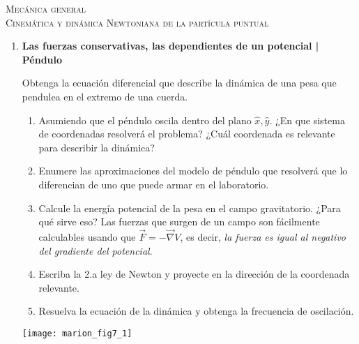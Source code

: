 \documentclass[11pt,spanish,a4paper]{article}
\begin{document}
\begin{center}
  \textsc{\large Mecánica general}\\
  \textsc{\large Cinemática y dinámica Newtoniana de la partícula puntual}
\end{center}

\begin{enumerate}


\subsection*{Ecuaciones de la dinámica - 2"a ley de Netwon}


\item
\textbf{Las fuerzas conservativas, las dependientes de un potencial | Péndulo}\\
\begin{minipage}[t][10cm]{0.8\textwidth}
Obtenga la ecuación diferencial que describe la dinámica de una pesa que pendulea en el extremo de una cuerda.
\begin{enumerate}
	\item Asumiendo que el péndulo oscila dentro del plano \(\hat{x}, \hat{y}\).
		¿En que sistema de coordenadas resolverá el problema? 
		¿Cuál coordenada es relevante para describir la dinámica? 
	\item Enumere las aproximaciones del modelo de péndulo que resolverá que lo diferencian de uno que puede armar en el laboratorio.
	\item Calcule la energía potencial de la pesa en el campo gravitatorio.
	¿Para qué sirve eso?
	Las fuerzas que surgen de un campo son fácilmente calculables usando que \(\vec{F} = - \vec{\nabla} V\), es decir, \emph{la fuerza es igual al negativo del gradiente del potencial}.
	\item Escriba la 2.a ley de Newton y proyecte en la dirección de la coordenada relevante.
	\item Resuelva la ecuación de la dinámica y obtenga la frecuencia de oscilación.
\end{enumerate}
\end{minipage}
\begin{minipage}[c][0cm][t]{0.15\textwidth}
	\texttt{[image: marion\_fig7\_1]}
\end{minipage}


\end{enumerate}
\end{document}
